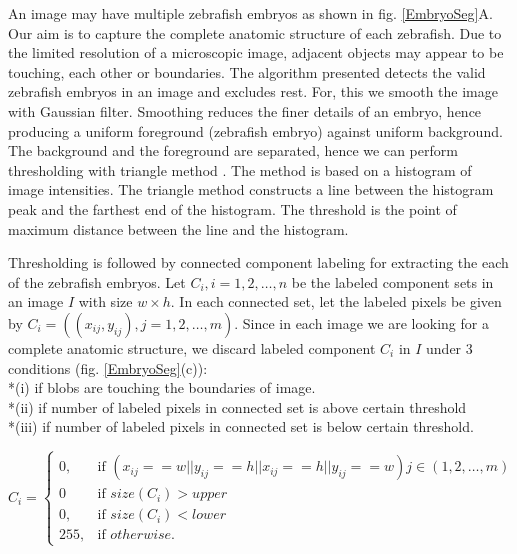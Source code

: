 An image may have multiple zebrafish embryos as shown in fig. \ref{EmbryoSeg}A. Our aim is to capture the complete anatomic structure of each zebrafish. Due to the limited resolution of a microscopic image, adjacent objects may appear to be touching, each other or boundaries. The algorithm presented detects the valid zebrafish embryos in an image and excludes rest. For, this we smooth the image with Gaussian filter. 
Smoothing reduces the finer details of an embryo, hence producing a uniform foreground (zebrafish embryo) against uniform background.  The background and the foreground are separated, hence we can perform thresholding with triangle method \cite{zack77}. The method is based on a histogram of image intensities. The triangle method constructs a line between the histogram peak and the farthest end of the histogram. The threshold is the point of maximum distance between the line and the histogram. 

Thresholding is followed by connected component labeling for extracting the each of the zebrafish embryos. Let $C_{i}, i = 1,2,\ldots, n$ be the labeled component sets in an image $I$ with size $w\times h$. In each connected set, let the labeled pixels be given by $C_{i} =  ((x_{ij}, y_{ij}), j= 1,2,\ldots, m)$. 
Since in each image we are looking for a complete anatomic structure, we discard labeled component $C_{i}$ in $I$ under 3 conditions (fig. \ref{EmbryoSeg}(c)): 
\\*(i) if blobs are touching the boundaries of image. 
\\*(ii) if number of labeled pixels in connected set is above certain threshold  
\\*(iii) if number of labeled pixels in connected set is below certain threshold. 

\begin{equation}
C_{i} = \begin{cases} 0, &\mbox{if } (x_{ij} == w || y_{ij}  == h ||x_{ij} == h || y_{ij}  == w) j \in (1,2,\ldots, m) \\
0 & \mbox{if } size(C_{i}) > upper \\
0, & \mbox{if } size(C_{i}) < lower \\ 
255, & \mbox{if } otherwise. \end{cases}  
\end{equation}

